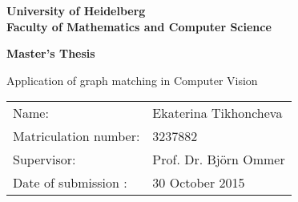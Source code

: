 \begin{titlepage}
\begin{center}
\textbf{ 
\Large University of Heidelberg\\
\smallskip
\Large Faculty of Mathematics and Computer Science\\
\smallskip
\vspace{0.5\baselineskip}{\Large
Computer Vision group \linebreak
at \linebreak
Heidelberg Collaboratory for Image Processing%
}
}

\vspace{3.0cm}

\textbf{\large Master's Thesis} 

\vspace{0.5\baselineskip}
{\huge
Application of graph matching in Computer Vision
}
\end{center}

\vfill 

{\large
\begin{tabular}[l]{ll}
Name: & Ekaterina Tikhoncheva\\
Matriculation number: & 3237882\\
Supervisor: & Prof. Dr. Bj\"{o}rn Ommer\\
Date of submission : & 30 October 2015
\end{tabular}
}
\end{titlepage}